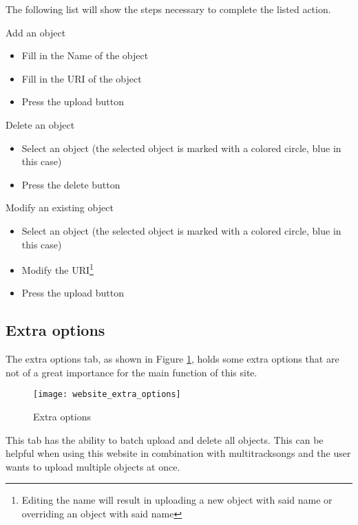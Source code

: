 The following list will show the steps necessary to complete the listed action.
\begin{shortlist}
    \item Add an object
    \begin{itemize}
        \item Fill in the Name of the object
        \item Fill in the URI of the object
        \item Press the upload button
    \end{itemize}
    \item Delete an object
    \begin{itemize}
        \item Select an object (the selected object is marked with a colored circle, blue in this case)
        \item Press the delete button
    \end{itemize}
    \item Modify an existing object
    \begin{itemize}
        \item Select an object (the selected object is marked with a colored circle, blue in this case)
        \item Modify the URI\footnote{Editing the name will result in uploading a new object with said name or overriding an object with said name}
        \item Press the upload button
    \end{itemize}
\end{shortlist}

\subsection{Extra options}
\label{sub:website_Extra_options}
The extra options tab, as shown in Figure \ref{fig:website_extra_options}, holds some extra options that are not of a great importance for the main function of this site.

\begin{figure}[H]
    \centering
    \texttt{[image: website\_extra\_options]}
    \caption{Extra options}
    \label{fig:website_extra_options}
\end{figure}

This tab has the ability to batch upload and delete all objects.
This can be helpful when using this website in combination with multitrack\footnotemark songs and the user wants to upload multiple objects at once.
